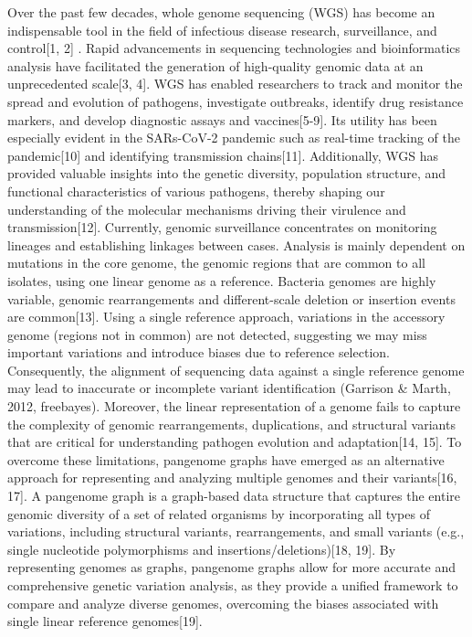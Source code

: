 Over the past few decades, whole genome sequencing (WGS) has become an indispensable tool in the field of infectious disease research, surveillance, and control[1, 2] . Rapid advancements in sequencing technologies and bioinformatics analysis have facilitated the generation of high-quality genomic data at an unprecedented scale[3, 4]. WGS has enabled researchers to track and monitor the spread and evolution of pathogens, investigate outbreaks, identify drug resistance markers, and develop diagnostic assays and vaccines[5-9].  Its utility has been especially evident in the SARs-CoV-2 pandemic such as  real-time tracking of the pandemic[10] and identifying transmission chains[11]. Additionally, WGS has provided valuable insights into the genetic diversity, population structure, and functional characteristics of various pathogens, thereby shaping our understanding of the molecular mechanisms driving their virulence and transmission[12].
Currently, genomic surveillance concentrates on monitoring lineages and establishing linkages between cases. Analysis is mainly dependent on mutations in the core genome, the genomic regions that are common to all isolates, using one linear genome as a reference. Bacteria genomes are highly variable, genomic rearrangements and different-scale deletion or insertion events are common[13]. Using a single reference approach, variations in the accessory genome (regions not in common) are not detected, suggesting we may miss important variations and  introduce biases due to reference selection. Consequently, the alignment of sequencing data against a single reference genome may lead to inaccurate or incomplete variant identification (Garrison & Marth, 2012, freebayes). Moreover, the linear representation of a genome fails to capture the complexity of genomic rearrangements, duplications, and structural variants that are critical for understanding pathogen evolution and adaptation[14, 15]. 
To overcome these limitations, pangenome graphs have emerged as an alternative approach for representing and analyzing multiple genomes and their variants[16, 17]. A pangenome graph is a graph-based data structure that captures the entire genomic diversity of a set of related organisms by incorporating all types of variations, including structural variants, rearrangements, and small variants (e.g., single nucleotide polymorphisms and insertions/deletions)[18, 19]. By representing genomes as graphs, pangenome graphs allow for more accurate and comprehensive genetic variation analysis, as they provide a unified framework to compare and analyze diverse genomes, overcoming the biases associated with single linear reference genomes[19].
